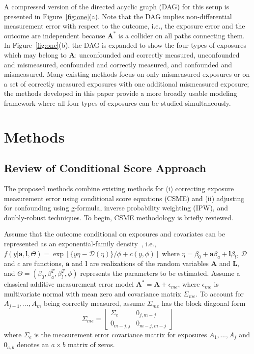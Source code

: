 \documentclass[useAMS,usenatbib,referee]{biom}
\begin{document}
A compressed version of the directed acyclic graph (DAG) for this setup is presented in Figure~\ref{fig:one}(a). Note that the DAG implies non-differential measurement error with respect to the outcome, i.e., the exposure error and the outcome are independent because $\bm{A}^{*}$ is a collider on all paths connecting them. In Figure~\ref{fig:one}(b), the DAG is expanded to show the four types of exposures which may belong to $\bm{A}$: unconfounded and correctly measured, unconfounded and mismeasured, confounded and correctly measured, and confounded and mismeasured. Many existing methods focus on only mismeasured exposures or on a set of correctly measured exposures with one additional mismeasured exposure; the methods developed in this paper provide a more broadly usable modeling framework where all four types of exposures can be studied simultaneously.

\section{Methods}
\label{s:methods}

\subsection{Review of Conditional Score Approach}

The proposed methods combine existing methods for (i) correcting exposure measurement error using conditional score equations (CSME) and (ii) adjusting for confounding using g-formula, inverse probability weighting (IPW), and doubly-robust techniques. To begin, CSME methodology is briefly reviewed.

Assume that the outcome conditional on exposures and covariates can be represented as an exponential-family density~\citep{mccullagh2018}, i.e., $f(y | \bm{a}, \bm{l}, \Theta) = \exp [ \{y\eta - \mathcal{D}(\eta)\}/ \phi + c(y, \phi) ]$ where $\eta = \beta_{0} + \bm{a}\beta_{a} + \bm{l}\beta_{l}$, $\mathcal{D}$ and $c$ are functions, $\bm{a}$ and $\bm{l}$ are realizations of the random variables $\bm{A}$ and $\bm{L}$, and $\Theta = (\beta_{0}, \beta^{T}_{a}, \beta^{T}_{l}, \phi)$ represents the parameters to be estimated. Assume a classical additive measurement error model $\bm{A}^{*} = \bm{A} + \epsilon_{me}$, where $\epsilon_{me}$ is multivariate normal with mean zero and covariance matrix $\Sigma_{me}$. To account for $A_{j+1}, ...,  A_{m}$ being correctly measured, assume $\Sigma_{me}$ has the block diagonal form
\begin{equation*}
    \Sigma_{me} =
    \begin{bmatrix}
    \Sigma_{e} & 0_{j,m-j} \\
    0_{m-j,j} & 0_{m-j,m-j}
    \end{bmatrix}
\end{equation*}
where $\Sigma_{e}$ is the measurement error covariance matrix for exposures $A_{1},...,A_{j}$ and $0_{a,b}$ denotes an $a \times b$ matrix of zeros.
\end{document}
